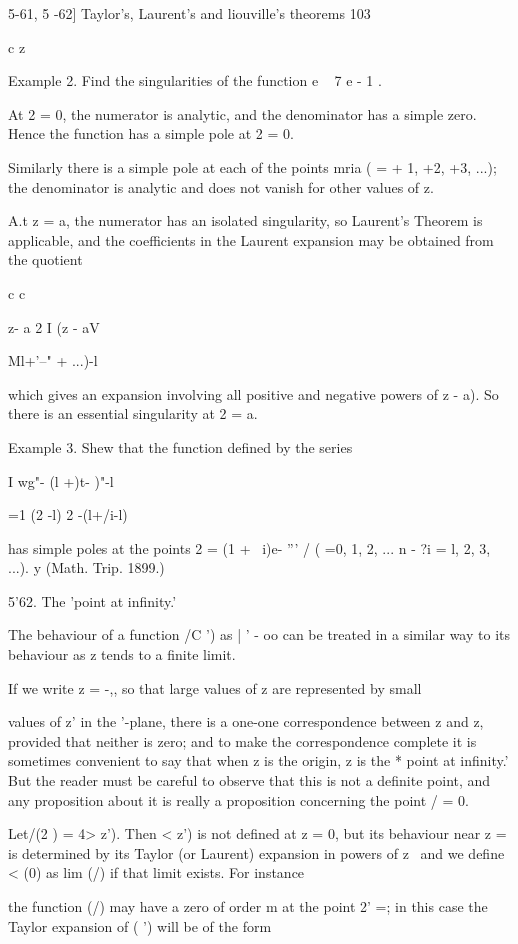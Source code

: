 {{{{5-61, 5 -62] Taylor's, Laurent's and liouville's theorems 103

c z\

Example 2. Find the singularities of the function e ~ 7 e - 1 .

At 2 = 0, the numerator is analytic, and the denominator has a simple
zero. Hence the function has a simple pole at 2 = 0.

Similarly there is a simple pole at each of the points mria ( = + 1,
+2, +3, ...); the denominator is analytic and does not vanish for
other values of z.

A.t z = a, the numerator has an isolated singularity, so Laurent's
Theorem is applicable, and the coefficients in the Laurent expansion
may be obtained from the quotient

c c

z- a 2 I (z - aV

Ml+'--" + ...)-l

which gives an expansion involving all positive and negative powers of
z - a). So there is an essential singularity at 2 = a.

Example 3. Shew that the function defined by the series

I wg"- (l +)t- )"-l

 =1 (2 -l) 2 -(l+/i-l)

has simple poles at the points 2 = (1 + ~i)e- ''' / ( =0, 1, 2, ... n
- \; ?i = l, 2, 3, ...). y (Math. Trip. 1899.)

5'62. The 'point at infinity.'

The behaviour of a function /C ') as | ' - oo can be treated in a
similar way to its behaviour as z tends to a finite limit.

If we write z = -,, so that large values of z are represented by small

values of z' in the '-plane, there is a one-one correspondence between
z and z, provided that neither is zero; and to make the
correspondence complete it is sometimes convenient to say that when z
is the origin, z is the * point at infinity.' But the reader must be
careful to observe that this is not a definite point, and any
proposition about it is really a proposition concerning the point / =
0.

Let/(2 ) = 4> z'). Then < z') is not defined at z = 0, but its
behaviour near z = is determined by its Taylor (or Laurent) expansion
in powers of z \ and we define < (0) as lim (/) if that limit exists.
For instance

the function (/) may have a zero of order m at the point 2' =; in
this case the Taylor expansion of ( ') will be of the form

}}}}
